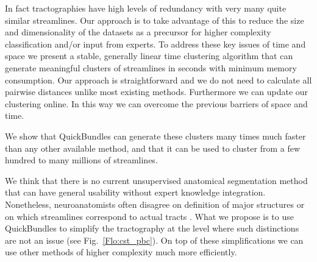 \documentclass{bioinfo}
\begin{document}

In fact tractographies have high levels of redundancy with very many
quite similar streamlines. Our approach is to take advantage of this to
reduce the size and dimensionality of the datasets as a precursor for
higher complexity classification and/or input from experts. To address
these key issues of time and space we present a stable, generally linear
time clustering algorithm that can generate meaningful clusters of
streamlines in seconds with minimum memory consumption. Our approach is
 straightforward and we do not need to calculate all pairwise
distances unlike most existing methods. Furthermore we can update our
clustering online. In this way we can overcome the previous barriers of
space and time.

We show that QuickBundles can generate these clusters many times much
faster than any other available method, and that it can be used to
cluster from a few hundred to many millions of streamlines.

We think that there is no current unsupervised anatomical segmentation
method that can have general usability without expert knowledge
integration. Nonetheless, neuroanatomists often disagree on definition
of major structures or on which streamlines correspond to actual tracts
\citep{schmahmann2009fiber, makris2005segmentation,
  frey2008dissociating,catani2005perisylvian, moriBook,
  fernandez2012high, verstynen2011vivo}.  What we propose is to use
QuickBundles to simplify the tractography at the level where such
distinctions are not an issue (see Fig.~\ref{Flo:cst_pbc}). On top of
these simplifications we can use other methods of higher complexity much
more efficiently.
\end{document}
